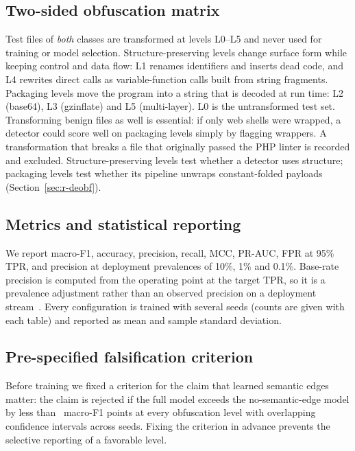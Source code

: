 \documentclass[pdflatex,sn-mathphys-num]{sn-jnl}
\begin{document}
\subsection{Two-sided obfuscation matrix}\label{sec:p-obf}
Test files of \emph{both} classes are transformed at levels L0--L5 and never
used for training or model selection. Structure-preserving levels change
surface form while keeping control and data flow: L1 renames identifiers and
inserts dead code, and L4 rewrites direct calls as variable-function calls
built from string fragments. Packaging levels move the program into a string
that is decoded at run time: L2 (base64), L3 (gzinflate) and L5 (multi-layer).
L0 is the untransformed test set. Transforming benign files as well is
essential: if only web shells were wrapped, a detector could score well on
packaging levels simply by flagging wrappers. A transformation that breaks a
file that originally passed the PHP linter is recorded and excluded.
Structure-preserving levels test whether a detector uses structure; packaging
levels test whether its pipeline unwraps constant-folded payloads
(Section~\ref{sec:r-deobf}).

\subsection{Metrics and statistical reporting}\label{sec:p-metrics}
We report macro-F1, accuracy, precision, recall, MCC, PR-AUC, FPR at 95\% TPR,
and precision at deployment prevalences of 10\%, 1\% and 0.1\%. Base-rate
precision is computed from the operating point at the target TPR, so it is a
prevalence adjustment rather than an observed precision on a deployment
stream~\cite{axelsson2000base}. Every configuration is trained with several
seeds (counts are given with each table) and reported as mean and sample
standard deviation.

\subsection{Pre-specified falsification criterion}\label{sec:p-c11}
Before training we fixed a criterion for the claim that learned semantic edges
matter: the claim is rejected if the full model exceeds the no-semantic-edge
model by less than \CElevenMargin\ macro-F1 points at every obfuscation level
with overlapping confidence intervals across seeds. Fixing the criterion in
advance prevents the selective reporting of a favorable level.

\end{document}
